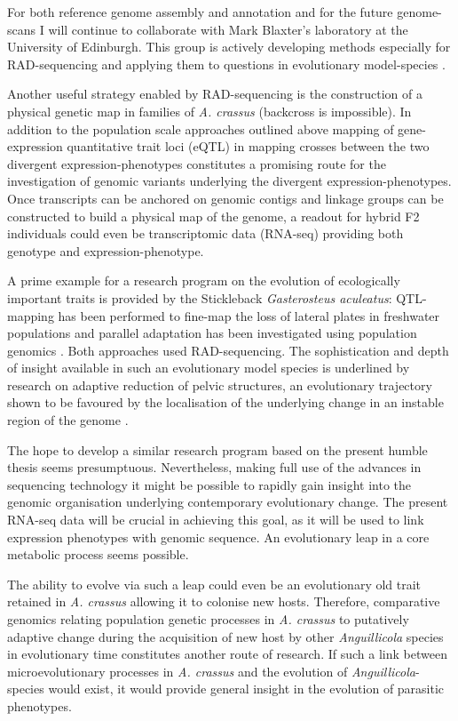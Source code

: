 For both reference genome assembly and annotation and for the future
genome-scans I will continue to collaborate with Mark Blaxter's
laboratory at the University of Edinburgh. This group is actively
developing methods especially for RAD-sequencing and applying them to
questions in evolutionary model-species \cite{pmid21681211}.

Another useful strategy enabled by RAD-sequencing is the construction
of a physical genetic map in families of \textit{A. crassus}
(backcross is impossible). In addition to the population scale
approaches outlined above mapping of gene-expression quantitative
trait loci (eQTL) in mapping crosses between the two divergent
expression-phenotypes constitutes a promising route for the
investigation of genomic variants underlying the divergent
expression-phenotypes. Once transcripts can be anchored on genomic
contigs and linkage groups can be constructed to build a physical map
of the genome, a readout for hybrid F2 individuals could even be
transcriptomic data (RNA-seq) providing both genotype and
expression-phenotype.

A prime example for a research program on the evolution of
ecologically important traits is provided by the Stickleback
\textit{Gasterosteus aculeatus}: QTL-mapping has been performed to
fine-map the loss of lateral plates in freshwater populations
\cite{pmid18852878} and parallel adaptation has been investigated
using population genomics \cite{pmid20195501}. Both approaches used
RAD-sequencing. The sophistication and depth of insight available in
such an evolutionary model species is underlined by research on
adaptive reduction of pelvic structures, an evolutionary trajectory
shown to be favoured by the localisation of the underlying change in
an instable region of the genome \cite{pmid20007865}.

The hope to develop a similar research program based on the present
humble thesis seems presumptuous. Nevertheless, making full use of the
advances in sequencing technology it might be possible to rapidly gain
insight into the genomic organisation underlying contemporary
evolutionary change. The present RNA-seq data will be crucial in
achieving this goal, as it will be used to link expression phenotypes
with genomic sequence. An evolutionary leap in a core metabolic
process seems possible.

The ability to evolve via such a leap could even be an evolutionary
old trait retained in \textit{A. crassus} allowing it to colonise new
hosts. Therefore, comparative genomics relating population genetic
processes in \textit{A. crassus} to putatively adaptive change during
the acquisition of new host by other \textit{Anguillicola} species in
evolutionary time constitutes another route of research. If such a
link between microevolutionary processes in \textit{A. crassus} and
the evolution of \textit{Anguillicola}-species would exist, it would
provide general insight in the evolution of parasitic phenotypes.

